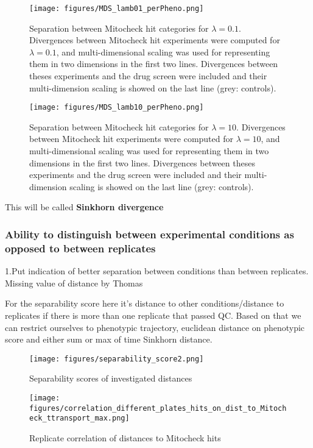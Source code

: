 \begin{figure*}[ht!]
\centerline{
\texttt{[image: figures/MDS\_lamb01\_perPheno.png]}
}
\caption{Separation between Mitocheck hit categories for $\lambda=0.1$. Divergences between Mitocheck hit experiments were computed for $\lambda=0.1$, and multi-dimensional scaling was used for representing them in two dimensions in the first two lines. Divergences between theses experiments and the drug screen were included and their multi-dimension scaling is showed on the last line (grey: controls).}
\label{lambda_choice2}
\end{figure*}
\begin{figure*}[ht!]
\centerline{
\texttt{[image: figures/MDS\_lamb10\_perPheno.png]}}
\caption{Separation between Mitocheck hit categories for $\lambda=10$. Divergences between Mitocheck hit experiments were computed for $\lambda=10$, and multi-dimensional scaling was used for representing them in two dimensions in the first two lines. Divergences between theses experiments and the drug screen were included and their multi-dimension scaling is showed on the last line (grey: controls).}
\label{lambda_choice2}
\end{figure*}
This will be called \textbf{Sinkhorn divergence}

\subsubsection{Ability to distinguish between experimental conditions as opposed to between replicates}



1.Put indication of better separation between conditions than between replicates. Missing value of distance by Thomas

For the separability score here it's distance to other conditions/distance to replicates if there is more than one replicate that passed QC. Based on that we can restrict ourselves to phenotypic trajectory, euclidean distance on phenotypic score and either sum or max of time Sinkhorn distance.
\begin{figure*}[ht!]
\centerline{\texttt{[image: figures/separability\_score2.png]}
}
\caption{Separability scores of investigated distances}
\label{separability}
\end{figure*}

\begin{figure*}[ht!]
\centerline{\texttt{[image: figures/correlation\_different\_plates\_hits\_on\_dist\_to\_Mitocheck\_ttransport\_max.png]}
}
\caption{Replicate correlation of distances to Mitocheck hits}
\label{replicate_correlation}
\end{figure*}

